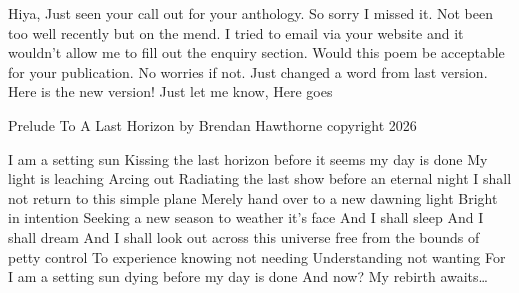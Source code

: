 Hiya,
Just seen your call out for your anthology. So sorry I missed it. Not been too well recently but on the mend.
I tried to email via your website and it wouldn’t allow me to fill out the enquiry section.
Would this poem be acceptable for your publication.
No worries if not.
Just changed a word from last version.
Here is the new version!
Just let me know,
Here goes

Prelude To A Last Horizon by Brendan Hawthorne copyright 2026

I am a setting sun
Kissing the last horizon
before it seems 
my day is done
My light is leaching
Arcing out
Radiating the last show
before an eternal night
I shall not return
to this simple plane
Merely hand over
to a new dawning light
Bright in intention
Seeking a new season
to weather it’s face
And I shall sleep
And I shall dream
And I shall look out
across this universe
free from the bounds
of petty control
To experience knowing
not needing
Understanding
not wanting
For I am a setting sun
dying before 
my day is done
And now?
My rebirth awaits…
